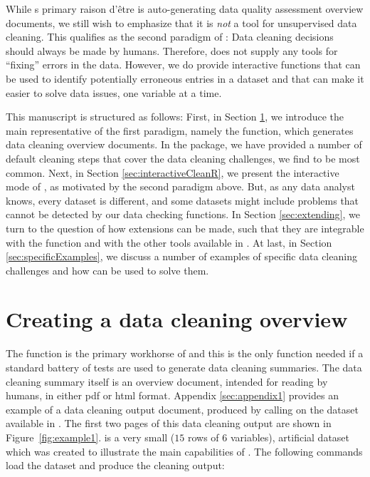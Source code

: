 \documentclass[article,shortnames]{jss}
\newcommand{\hl}[1]{\textcolor{magenta}{#1}}
\newcommand{\R}[1]{\code{#1}}
\begin{document}
While s primary raison d'être is auto-generating data
quality assessment overview documents, we still wish to emphasize that
it is \emph{not} a tool for unsupervised data cleaning. This qualifies
as the second paradigm of : Data cleaning decisions
should always be made by humans. Therefore,  does not
supply any tools for ``fixing'' errors in the data. However, we do
provide interactive functions that can be used to identify potentially
erroneous entries in a dataset and that can make it easier to solve
data issues, one variable at a time.


This manuscript is structured as follows: First, in Section
\ref{sec:usingdataMaid}, we introduce the main representative of the first
paradigm, namely the  function, which generates data
cleaning overview documents. In the  package, we have
provided a number of default cleaning steps that cover the data
cleaning challenges, we find to be most common. Next, in Section
\ref{sec:interactiveCleanR}, we present the interactive mode of , as motivated
by the second paradigm above. But, as any data analyst knows,
every dataset is different, and some datasets might include problems
that cannot be detected by our data checking functions. In Section
\ref{sec:extending}, we turn to the question of how  extensions
can be made, such that they are integrable with the 
function and with the other tools available in .  At last,
in Section \ref{sec:specificExamples}, we discuss a number of examples of
specific data cleaning challenges and how  can be used to
solve them.






\section{Creating a data cleaning overview}
\label{sec:usingdataMaid}

The  function is the primary workhorse of  and
this is the only function needed if a standard battery
of tests are used to generate data cleaning summaries. The data
cleaning summary itself is an overview document, intended for reading
by humans, in either pdf or html format. Appendix \ref{sec:appendix1}
provides an example of a data cleaning output document, produced by
calling  on the dataset  available in
. The first two pages of this data cleaning output are
shown in Figure~\ref{fig:example1}.  is a very
small ($15$ rows of $6$ variables), artificial dataset which was created to
illustrate the main capabilities of . The following
commands load the dataset and produce the cleaning output:
\end{document}
